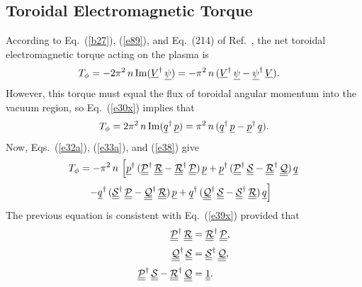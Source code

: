 \documentclass[12pt,prb,aps]{revtex4-1}
\begin{document}
\subsection{Toroidal Electromagnetic Torque}
According to Eq.~(\ref{b27}), (\ref{e89}), and Eq.~(214) of Ref.~, 
the net toroidal electromagnetic torque acting on the plasma  is
\begin{align}\label{e38}
T_\phi&= -2\pi^2\,n\,{\rm Im}(\underline{V}^\dag\,\underline{\psi})= -\pi^2\,n\,(\underline{V}^\dag\,\underline{\psi}-\underline{\psi}^\dag\,\underline{V}).
\end{align}
However, this torque must equal the flux of toroidal angular momentum into the vacuum region, so Eq.~(\ref{e30x}) implies that
\begin{equation}\label{e39x}
T_\phi= 2\pi^2\,n\,{\rm Im}(\underline{q}^\dag\,\underline{p})= \pi^2\,n\,(\underline{q}^\dag\,\underline{p}- \underline{p}^\dag\,\underline{q}).
\end{equation}
Now, Eqs.~(\ref{e32a}), (\ref{e33a}), and (\ref{e38}) give 
\begin{align}
T_\phi&= -\pi^2\,n\,\left[
\underline{p}^\dag\,(\underline{\underline{\cal P}}^\dag\,\underline{\underline{\cal R}}
- \underline{\underline{\cal R}}^\dag\,\underline{\underline{\cal P}})\,\underline{p}
+\underline{p}^\dag\,(\underline{\underline{\cal P}}^\dag\,\underline{\underline{\cal S}}
-\underline{\underline{\cal R}}^\dag\,\underline{\underline{\cal Q}})\,\underline{q}\right.\nonumber\\[0.5ex]
&\phantom{=}\left.- \underline{q}^\dag\,(\underline{\underline{\cal S}}^\dag\,\underline{\underline{\cal P}}
- \underline{\underline{\cal Q}}^\dag\,\underline{\underline{\cal R}})\,\underline{p}
+\underline{q}^\dag\,(\underline{\underline{\cal Q}}^\dag\,\underline{\underline{\cal S}}
- \underline{\underline{\cal S}}^\dag\,\underline{\underline{\cal R}})\,\underline{q}
\right]
\end{align}
The previous equation is consistent with Eq.~(\ref{e39x}) provided that
\begin{align}\label{e41x}
\underline{\underline{\cal P}}^\dag\,\underline{\underline{\cal R}}&= \underline{\underline{\cal R}}^\dag\,\underline{\underline{\cal P}},\\[0.5ex]
\underline{\underline{\cal Q}}^\dag\,\underline{\underline{\cal S}}&= \underline{\underline{\cal S}}^\dag\,\underline{\underline{\cal Q}},\label{e42x}\\[0.5ex]
\underline{\underline{\cal P}}^\dag\,\underline{\underline{\cal S}}- \underline{\underline{\cal R}}^\dag\,\underline{\underline{\cal Q}}&=\underline{\underline{1}}.\label{e43}
\end{align}
\end{document}
